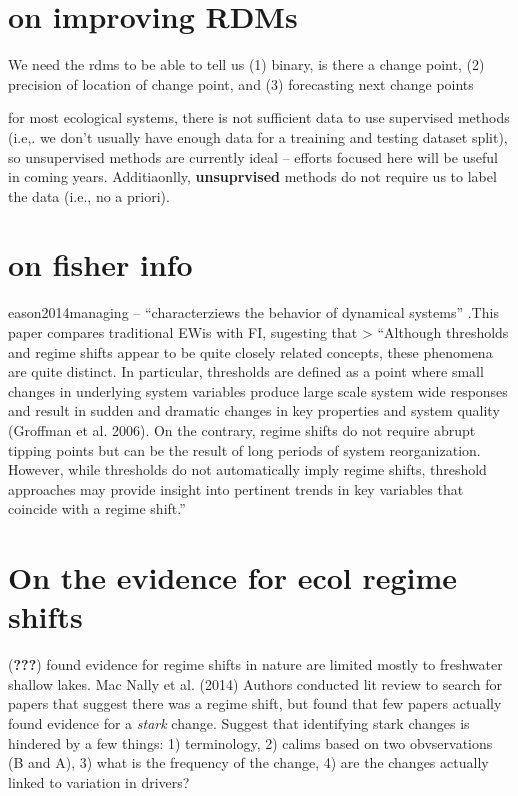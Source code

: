 \documentclass[12pt,twoside,openany]{reedthesis}
\begin{document}
\section{on improving RDMs}\label{on-improving-rdms}

We need the rdms to be able to tell us (1) binary, is there a change
point, (2) precision of location of change point, and (3) forecasting
next change points

for most ecological systems, there is not sufficient data to use
supervised methods (i.e,. we don't usually have enough data for a
treaining and testing dataset split), so unsupervised methods are
currently ideal -- efforts focused here will be useful in coming years.
Additiaonlly, \textbf{unsuprvised} methods do not require us to label
the data (i.e., no a priori).

\section{on fisher info}\label{on-fisher-info}

eason2014managing -- ``characterziews the behavior of dynamical
systems'' .This paper compares traditional EWis with FI, sugesting that
\textgreater{} ``Although thresholds and regime shifts appear to be
quite closely related concepts, these phenomena are quite distinct. In
particular, thresholds are defined as a point where small changes in
underlying system variables produce large scale system wide responses
and result in sudden and dramatic changes in key properties and system
quality (Groffman et al. 2006). On the contrary, regime shifts do not
require abrupt tipping points but can be the result of long periods of
system reorganization. However, while thresholds do not automatically
imply regime shifts, threshold approaches may provide insight into
pertinent trends in key variables that coincide with a regime shift.''

\section{On the evidence for ecol regime
shifts}\label{on-the-evidence-for-ecol-regime-shifts}

({\textbf{???}}) found evidence for regime shifts in nature are limited
mostly to freshwater shallow lakes. Mac Nally et al. (2014) Authors
conducted lit review to search for papers that suggest there was a
regime shift, but found that few papers actually found evidence for a
\emph{stark} change. Suggest that identifying stark changes is hindered
by a few things: 1) terminology, 2) calims based on two obvservations (B
and A), 3) what is the frequency of the change, 4) are the changes
actually linked to variation in drivers?
\end{document}
